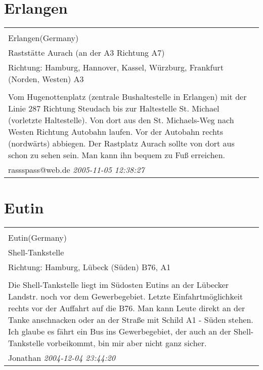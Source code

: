 \documentclass[a4paper,12pt]{article}
\begin{document}
\section{Erlangen}
\begin{tabular}{|p{13cm}|}
\hline\\
Erlangen(Germany)\\
Raststätte Aurach (an der A3 Richtung A7)\\
Richtung: Hamburg, Hannover, Kassel, Würzburg, Frankfurt (Norden, Westen) A3 \\
\hline\\
Vom Hugenottenplatz (zentrale Bushaltestelle in Erlangen) mit der Linie 287 Richtung Steudach bis zur Haltestelle St. Michael (vorletzte Haltestelle). Von dort aus den St. Michaels-Weg nach Westen Richtung Autobahn laufen. Vor der Autobahn rechts (nordwärts) abbiegen. Der Rastplatz Aurach sollte von dort aus schon zu sehen sein. Man kann ihn bequem zu Fuß erreichen. \\
rassspass@web.de \textit{ 2005-11-05 12:38:27 }\\\hline
\end{tabular}


\section{Eutin}
\begin{tabular}{|p{13cm}|}
\hline\\
Eutin(Germany)\\
Shell-Tankstelle\\
Richtung: Hamburg, Lübeck (Süden) B76, A1 \\
\hline\\
Die Shell-Tankstelle liegt im Südosten Eutins an der Lübecker Landstr. noch vor dem Gewerbegebiet. Letzte Einfahrtmöglichkeit rechts vor der Auffahrt auf die B76. Man kann Leute direkt an der Tanke anschnacken oder an der Straße mit Schild A1 - Süden stehen. Ich glaube es fährt ein Bus ins Gewerbegebiet, der auch an der Shell-Tankstelle vorbeikommt, bin mir aber nicht ganz sicher. \\
Jonathan \textit{ 2004-12-04 23:44:20 }\\\hline
\end{tabular}
\end{document}
